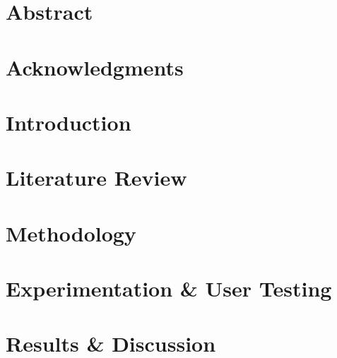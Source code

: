 \documentclass[a4paper,11pt,oneside,openany]{styles/ioniothesis}
\begin{document}
\cleardoublepage




\chapter*{Abstract} \pagestyle{headings}



\cleardoublepage

\chapter*{Acknowledgments} \pagestyle{headings}



\cleardoublepage

\tableofcontents
\cleardoublepage


\listoffigures
\cleardoublepage
\listoftables

\setlength{\parskip}{5pt}


\pagestyle{headings}
\cleardoublepage


\newpage
{}


\cleardoublepage


\chapter{Introduction} \label{chapter:intro}



\chapter{Literature Review} \label{chapter:literature}



\chapter{Methodology} \label{chapter:methodology}



\chapter{Experimentation \& User Testing} \label{chapter:experiments}



\chapter{Results \& Discussion} \label{chapter:results}

\end{document}
